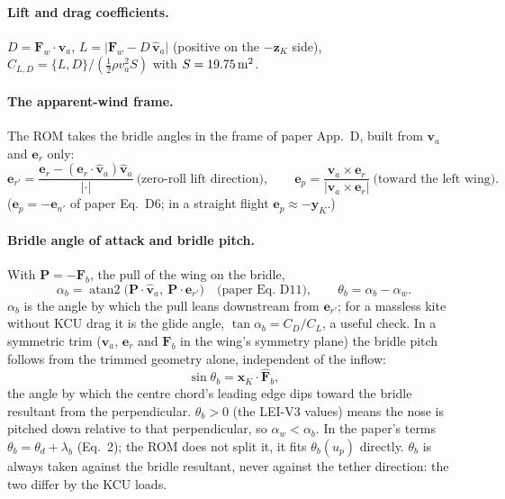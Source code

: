\documentclass[11pt,a4paper]{article}
\begin{document}
\paragraph{Lift and drag coefficients.}
$D=\mathbf F_w\cdot\hat{\mathbf v}_a$, $L=\bigl|\mathbf F_w-D\,\hat{\mathbf v}_a\bigr|$
(positive on the $-\mathbf z_K$ side), $C_{L,D}=\{L,D\}/(\tfrac12\rho v_a^2S)$
with $S=\SI{19.75}{\square\metre}$.

\paragraph{The apparent-wind frame.} The ROM takes the bridle angles in the
frame of paper App.~D, built from $\mathbf v_a$ and $\mathbf e_r$ only:
\begin{equation}
  \mathbf e_{r'}=\frac{\mathbf e_r-(\mathbf e_r\cdot\hat{\mathbf v}_a)\hat{\mathbf v}_a}{|\cdot|}
  \ \text{(zero-roll lift direction)},\qquad
  \mathbf e_{p}=\frac{\mathbf v_a\times\mathbf e_r}{|\mathbf v_a\times\mathbf e_r|}
  \ \text{(toward the left wing)}.
\end{equation}
($\mathbf e_p=-\mathbf e_{n'}$ of paper Eq.~D6; in a straight flight
$\mathbf e_p\approx-\mathbf y_K$.)

\paragraph{Bridle angle of attack and bridle pitch.} With
$\mathbf P=-\mathbf F_b$, the pull of the wing on the bridle,
\begin{equation}
  \alpha_b=\operatorname{atan2}\bigl(\mathbf P\cdot\hat{\mathbf v}_a,\ \mathbf P\cdot\mathbf e_{r'}\bigr)
  \quad\text{(paper Eq.~D11)},\qquad
  \theta_b=\alpha_b-\alpha_w .
  \label{eq:alpha-b}
\end{equation}
$\alpha_b$ is the angle by which the pull leans downstream from
$\mathbf e_{r'}$; for a massless kite without KCU drag it is the glide angle,
$\tan\alpha_b=C_D/C_L$, a useful check. In a symmetric trim ($\mathbf v_a$,
$\mathbf e_r$ and $\mathbf F_b$ in the wing's symmetry plane) the bridle
pitch follows from the trimmed geometry alone, independent of the inflow:
\begin{equation}
  \sin\theta_b=\mathbf x_K\cdot\hat{\mathbf F}_b ,
\end{equation}
the angle by which the centre chord's leading edge dips toward the bridle
resultant from the perpendicular. $\theta_b>0$ (the LEI-V3 values) means the
nose is pitched down relative to that perpendicular, so $\alpha_w<\alpha_b$.
In the paper's terms $\theta_b=\theta_d+\lambda_b$ (Eq.~2); the ROM does not
split it, it fits $\theta_b(u_p)$ directly. $\theta_b$ is always taken
against the bridle resultant, never against the tether direction: the two
differ by the KCU loads.
\end{document}
